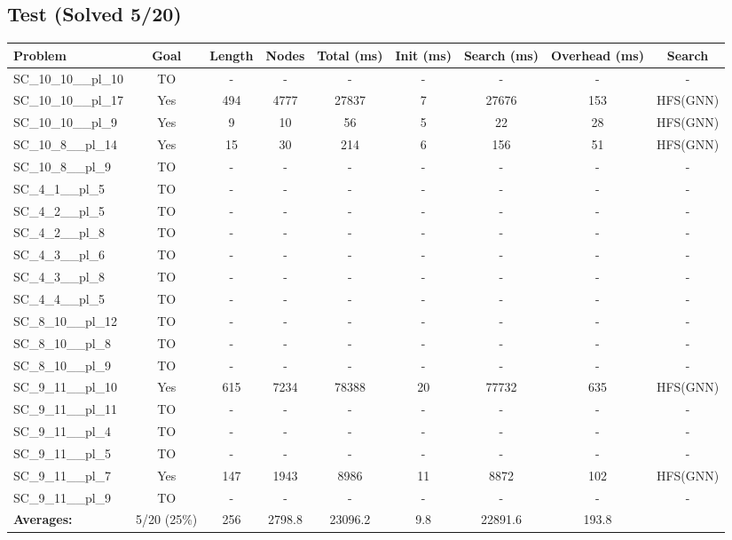 \documentclass{article}
\begin{document}
\subsection*{Test (Solved 5/20)}
\begin{tabular}{lcccccccc}
\toprule
Problem & Goal & Length & Nodes & Total (ms) & Init (ms) & Search (ms) & Overhead (ms) & Search \\
\midrule
SC\_10\_10\_\_pl\_10 & TO & - & - & - & - & - & - & - \\
SC\_10\_10\_\_pl\_17 & Yes & 494 & 4777 & 27837 & 7 & 27676 & 153 & HFS(GNN) \\
SC\_10\_10\_\_pl\_9 & Yes & 9 & 10 & 56 & 5 & 22 & 28 & HFS(GNN) \\
SC\_10\_8\_\_pl\_14 & Yes & 15 & 30 & 214 & 6 & 156 & 51 & HFS(GNN) \\
SC\_10\_8\_\_pl\_9 & TO & - & - & - & - & - & - & - \\
SC\_4\_1\_\_pl\_5 & TO & - & - & - & - & - & - & - \\
SC\_4\_2\_\_pl\_5 & TO & - & - & - & - & - & - & - \\
SC\_4\_2\_\_pl\_8 & TO & - & - & - & - & - & - & - \\
SC\_4\_3\_\_pl\_6 & TO & - & - & - & - & - & - & - \\
SC\_4\_3\_\_pl\_8 & TO & - & - & - & - & - & - & - \\
SC\_4\_4\_\_pl\_5 & TO & - & - & - & - & - & - & - \\
SC\_8\_10\_\_pl\_12 & TO & - & - & - & - & - & - & - \\
SC\_8\_10\_\_pl\_8 & TO & - & - & - & - & - & - & - \\
SC\_8\_10\_\_pl\_9 & TO & - & - & - & - & - & - & - \\
SC\_9\_11\_\_pl\_10 & Yes & 615 & 7234 & 78388 & 20 & 77732 & 635 & HFS(GNN) \\
SC\_9\_11\_\_pl\_11 & TO & - & - & - & - & - & - & - \\
SC\_9\_11\_\_pl\_4 & TO & - & - & - & - & - & - & - \\
SC\_9\_11\_\_pl\_5 & TO & - & - & - & - & - & - & - \\
SC\_9\_11\_\_pl\_7 & Yes & 147 & 1943 & 8986 & 11 & 8872 & 102 & HFS(GNN) \\
SC\_9\_11\_\_pl\_9 & TO & - & - & - & - & - & - & - \\
\textbf{Averages:} & 5/20 (25\%) & 256 & 2798.8 & 23096.2 & 9.8 & 22891.6 & 193.8 & \\
\bottomrule
\end{tabular}
\\[0.7cm]
\end{document}
